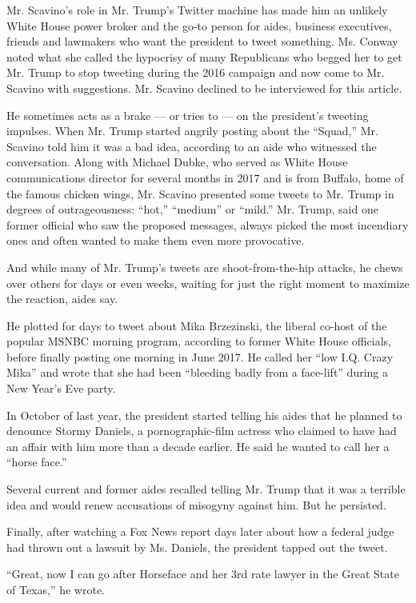 Mr. Scavino's role in Mr. Trump's Twitter machine has made him an
unlikely White House power broker and the go-to person for aides,
business executives, friends and lawmakers who want the president to
tweet something. Ms. Conway noted what she called the hypocrisy of many
Republicans who begged her to get Mr. Trump to stop tweeting during the
2016 campaign and now come to Mr. Scavino with suggestions. Mr. Scavino
declined to be interviewed for this article.

He sometimes acts as a brake --- or tries to --- on the president's
tweeting impulses. When Mr. Trump started angrily posting about the
``Squad,'' Mr. Scavino told him it was a bad idea, according to an aide
who witnessed the conversation. Along with Michael Dubke, who served as
White House communications director for several months in 2017 and is
from Buffalo, home of the famous chicken wings, Mr. Scavino presented
some tweets to Mr. Trump in degrees of outrageousness: ``hot,''
``medium'' or ``mild.'' Mr. Trump, said one former official who saw the
proposed messages, always picked the most incendiary ones and often
wanted to make them even more provocative.

And while many of Mr. Trump's tweets are shoot-from-the-hip attacks, he
chews over others for days or even weeks, waiting for just the right
moment to maximize the reaction, aides say.

He plotted for days to tweet about Mika Brzezinski, the liberal co-host
of the popular MSNBC morning program, according to former White House
officials, before finally posting one morning in June 2017. He called
her ``low I.Q. Crazy Mika'' and wrote that she had been ``bleeding badly
from a face-lift'' during a New Year's Eve party.

In October of last year, the president started telling his aides that he
planned to denounce Stormy Daniels, a pornographic-film actress who
claimed to have had an affair with him more than a decade earlier. He
said he wanted to call her a ``horse face.''

Several current and former aides recalled telling Mr. Trump that it was
a terrible idea and would renew accusations of misogyny against him. But
he persisted.

Finally, after watching a Fox News report days later about how a federal
judge had thrown out a lawsuit by Ms. Daniels, the president tapped out
the tweet.

``Great, now I can go after Horseface and her 3rd rate lawyer in the
Great State of Texas,'' he wrote.

